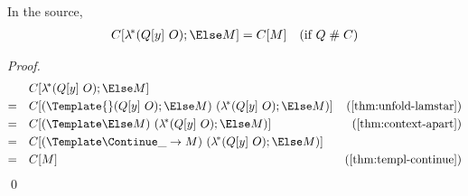 \begin{lemma}
  \label{thm:context-lamstar-apart}
  In the source,
  \begin{align*}
    C[\lamstar (Q[y] ~ O); \Else M]
    &=
    C[M]
    & (\text{if } Q \apart C)    
  \end{align*}
\end{lemma}
\begin{proof}
  \begin{align*}
    &\quad
    C[\lamstar (Q[y] ~ O); \Else M]
    \\
    =&\quad
    C[(\Template{} (Q[y] ~ O); \Else M) ~ (\lamstar (Q[y] ~ O); \Else M)]
    &(\cref{thm:unfold-lamstar})
    \\
    =&\quad
    C[(\Template \Else M) ~ (\lamstar (Q[y] ~ O); \Else M)]
    &(\cref{thm:context-apart})
    \\
    =&\quad
    C[(\Template \Continue \_ \to M) ~ (\lamstar (Q[y] ~ O); \Else M)]
    \\
    =&\quad
    C[M]
    &(\cref{thm:templ-continue})
  \end{align*}
  \qed
\end{proof}

